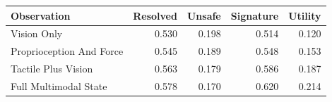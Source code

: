 \begin{tabular}{lrrrr}
\toprule
Observation & Resolved & Unsafe & Signature & Utility \\
\midrule
Vision Only & 0.530 & 0.198 & 0.514 & 0.120 \\
Proprioception And Force & 0.545 & 0.189 & 0.548 & 0.153 \\
Tactile Plus Vision & 0.563 & 0.179 & 0.586 & 0.187 \\
Full Multimodal State & 0.578 & 0.170 & 0.620 & 0.214 \\
\bottomrule
\end{tabular}
